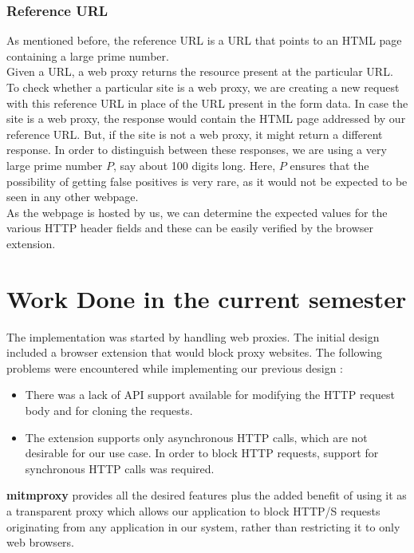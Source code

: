 \documentclass[a4paper,11pt,twocolumn]{article}
\begin{document}
\subsubsection{Reference URL} \label{url}
As mentioned before, the reference URL is a URL that points to an HTML page containing a large prime number.\\
Given a URL, a web proxy returns the resource present at the particular URL. To check whether a particular site is a web proxy, we are creating a new request with this reference URL in place of the URL present in the form data. In case the site is a web proxy, the response would contain the HTML page addressed by our reference URL. But, if the site is not a web proxy, it might return a different response. In order to distinguish between these responses, we are using a very large prime number \begin{math}P\end{math}, say about 100 digits long. Here, \begin{math}P\end{math} ensures that the possibility of getting false positives is very rare, as it would not be expected to be seen in any other webpage.\\
As the webpage is hosted by us, we can determine the expected values for the various HTTP header fields and these can be easily verified by the browser extension.
\section{Work Done in the current semester}
 The implementation was started by handling web proxies. The initial design included a browser extension that would block proxy websites. The following problems were encountered while implementing our previous design :
 \begin{itemize}
 	\item There was a lack of API support available for modifying the HTTP request body and for cloning the requests.
 	\item The extension supports only asynchronous HTTP calls, which are not desirable for our use case. In order to block HTTP requests, support for synchronous HTTP calls was required.
 \end{itemize}
\textbf{mitmproxy} provides all the desired features plus the added benefit of using it as a transparent proxy which allows our application to block HTTP/S requests originating from any application in our system, rather than restricting it to only web browsers.
\end{document}
